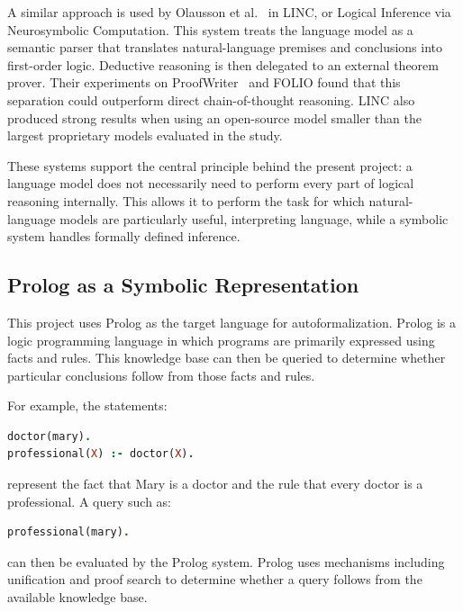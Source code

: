 \documentclass[11pt]{article} %
\theoremstyle{plain}
\theoremstyle{definition}
\begin{document}
A similar approach is used by Olausson et al.~\cite{olausson2023linc} in LINC,
or Logical Inference via Neurosymbolic Computation. This system treats the language model
as a semantic parser that translates natural-language premises and conclusions
into first-order logic. Deductive reasoning is then delegated to an external
theorem prover. Their experiments on ProofWriter~\cite{tafjord2021proofwriter}
and FOLIO found that this separation could outperform direct chain-of-thought
reasoning. LINC also produced strong results when using an open-source model
smaller than the largest proprietary models evaluated in the study.

These systems support the central principle behind the present project: a
language model does not necessarily need to perform every part of logical
reasoning internally. This allows it to perform the task for which
natural-language models are particularly useful, interpreting language, while
a symbolic system handles formally defined inference.


\subsection{Prolog as a Symbolic Representation}

This project uses Prolog as the target language for autoformalization. Prolog is
a logic programming language in which programs are primarily expressed using
facts and rules. This knowledge base can then be queried to determine whether
particular conclusions follow from those facts and rules.

For example, the statements:

\begin{tcolorbox}
\begin{lstlisting}[language=Prolog]
doctor(mary).
professional(X) :- doctor(X).
\end{lstlisting}
\end{tcolorbox}

represent the fact that Mary is a doctor and the rule that every doctor is a
professional. A query such as:

\begin{tcolorbox}
\begin{lstlisting}[language=Prolog]
professional(mary).
\end{lstlisting}
\end{tcolorbox}

can then be evaluated by the Prolog system. Prolog uses mechanisms including
unification and proof search to determine whether a query follows from the
available knowledge base.
\end{document}
